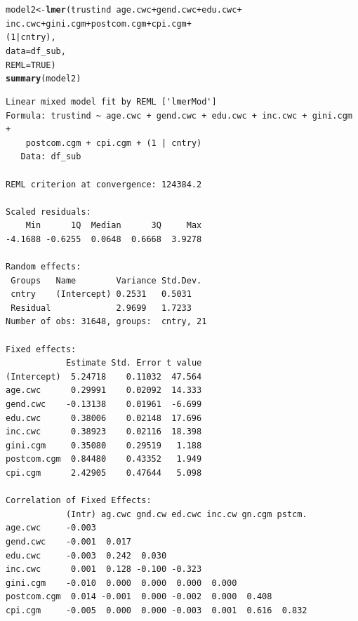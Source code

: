 \documentclass[12pt,english]{article}\usepackage[]{graphicx}\usepackage[usenames, dvipsnames]{xcolor}
\makeatletter
\newcommand{\hlnum}[1]{\textcolor[rgb]{0.686,0.059,0.569}{#1}}%
\newcommand{\hlopt}[1]{\textcolor[rgb]{0,0,0}{#1}}%
\newcommand{\hlstd}[1]{\textcolor[rgb]{0.345,0.345,0.345}{#1}}%
\newcommand{\hlkwb}[1]{\textcolor[rgb]{0.69,0.353,0.396}{#1}}%
\newcommand{\hlkwc}[1]{\textcolor[rgb]{0.333,0.667,0.333}{#1}}%
\newcommand{\hlkwd}[1]{\textcolor[rgb]{0.737,0.353,0.396}{\textbf{#1}}}%
\newenvironment{kframe}{%
 \def\at@end@of@kframe{}%
 \ifinner\ifhmode%
  \def\at@end@of@kframe{\end{minipage}}%
  \begin{minipage}{\columnwidth}%
 \fi\fi%
 \def\FrameCommand##1{\hskip\@totalleftmargin \hskip-\fboxsep
 \colorbox{shadecolor}{##1}\hskip-\fboxsep
     \hskip-\linewidth \hskip-\@totalleftmargin \hskip\columnwidth}%
 \MakeFramed {\advance\hsize-\width
   \@totalleftmargin\z@ \linewidth\hsize
   \@setminipage}}%
 {\par\unskip\endMakeFramed%
 \at@end@of@kframe}
\newenvironment{knitrout}{}{} %
\makeatother
\begin{document}
\begin{knitrout}
\color{fgcolor}\begin{kframe}
\begin{alltt}
\hlstd{model2} \hlkwb{<-} \hlkwd{lmer}\hlstd{(trustind} \hlopt{~} \hlstd{age.cwc} \hlopt{+} \hlstd{gend.cwc} \hlopt{+} \hlstd{edu.cwc} \hlopt{+}
                 \hlstd{inc.cwc} \hlopt{+} \hlstd{gini.cgm} \hlopt{+} \hlstd{postcom.cgm} \hlopt{+} \hlstd{cpi.cgm} \hlopt{+}
                 \hlstd{(}\hlnum{1} \hlopt{|} \hlstd{cntry),}
               \hlkwc{data} \hlstd{= df_sub,}
               \hlkwc{REML} \hlstd{=} \hlnum{TRUE}\hlstd{)}
\hlkwd{summary}\hlstd{(model2)}
\end{alltt}
\begin{verbatim}
Linear mixed model fit by REML ['lmerMod']
Formula: trustind ~ age.cwc + gend.cwc + edu.cwc + inc.cwc + gini.cgm +  
    postcom.cgm + cpi.cgm + (1 | cntry)
   Data: df_sub

REML criterion at convergence: 124384.2

Scaled residuals: 
    Min      1Q  Median      3Q     Max 
-4.1688 -0.6255  0.0648  0.6668  3.9278 

Random effects:
 Groups   Name        Variance Std.Dev.
 cntry    (Intercept) 0.2531   0.5031  
 Residual             2.9699   1.7233  
Number of obs: 31648, groups:  cntry, 21

Fixed effects:
            Estimate Std. Error t value
(Intercept)  5.24718    0.11032  47.564
age.cwc      0.29991    0.02092  14.333
gend.cwc    -0.13138    0.01961  -6.699
edu.cwc      0.38006    0.02148  17.696
inc.cwc      0.38923    0.02116  18.398
gini.cgm     0.35080    0.29519   1.188
postcom.cgm  0.84480    0.43352   1.949
cpi.cgm      2.42905    0.47644   5.098

Correlation of Fixed Effects:
            (Intr) ag.cwc gnd.cw ed.cwc inc.cw gn.cgm pstcm.
age.cwc     -0.003                                          
gend.cwc    -0.001  0.017                                   
edu.cwc     -0.003  0.242  0.030                            
inc.cwc      0.001  0.128 -0.100 -0.323                     
gini.cgm    -0.010  0.000  0.000  0.000  0.000              
postcom.cgm  0.014 -0.001  0.000 -0.002  0.000  0.408       
cpi.cgm     -0.005  0.000  0.000 -0.003  0.001  0.616  0.832
\end{verbatim}
\end{kframe}
\end{knitrout}
\end{document}
